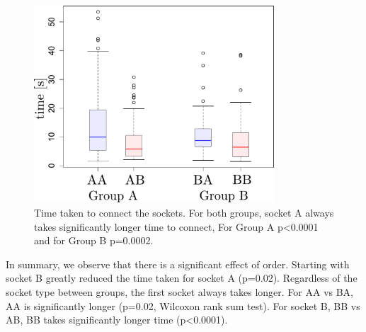 \begin{appendices}
\begin{figure}
  \centering
  \includegraphics[width=0.8\textwidth]{./ch4-PiH/Figures/Group_Socket.pdf}
   \caption{Time taken to connect the sockets. For both groups, socket A always takes significantly longer time to connect, For Group A 
   p<0.0001 and for Group B p=0.0002.}
   \label{figuretimesubgroup}
\end{figure}

In summary, we observe that there is a significant effect of order. Starting with socket B greatly reduced the time 
taken for socket A (p=0.02). Regardless of the socket type between groups, the first socket always takes longer.
For AA vs BA, AA is significantly longer (p=0.02, Wilcoxon rank sum test). For socket B, BB vs AB, BB takes significantly
longer time (p<0.0001).


\FloatBarrier

\end{appendices}
